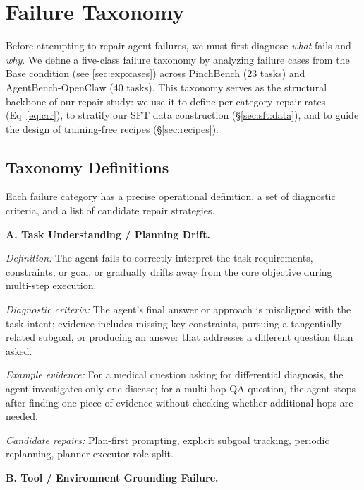 \section{Failure Taxonomy}
\label{sec:taxonomy}

Before attempting to repair agent failures, we must first diagnose \emph{what} fails and \emph{why}. We define a five-class failure taxonomy by analyzing failure cases from the Base condition (see \ref{sec:exp:cases}) across PinchBench (23 tasks) and AgentBench-OpenClaw (40 tasks). This taxonomy serves as the structural backbone of our repair study: we use it to define per-category repair rates (Eq~\ref{eq:crr}), to stratify our SFT data construction (\S\ref{sec:sft:data}), and to guide the design of training-free recipes (\S\ref{sec:recipes}).


\subsection{Taxonomy Definitions}
\label{sec:taxonomy:definitions}

Each failure category has a precise operational definition, a set of diagnostic criteria, and a list of candidate repair strategies.

\bigskip
\noindent\textbf{A. Task Understanding / Planning Drift.}

\textit{Definition:} The agent fails to correctly interpret the task requirements, constraints, or goal, or gradually drifts away from the core objective during multi-step execution.

\textit{Diagnostic criteria:} The agent's final answer or approach is misaligned with the task intent; evidence includes missing key constraints, pursuing a tangentially related subgoal, or producing an answer that addresses a different question than asked.

\textit{Example evidence:} For a medical question asking for differential diagnosis, the agent investigates only one disease; for a multi-hop QA question, the agent stops after finding one piece of evidence without checking whether additional hops are needed.

\textit{Candidate repairs:} Plan-first prompting, explicit subgoal tracking, periodic replanning, planner-executor role split.

\bigskip
\noindent\textbf{B. Tool / Environment Grounding Failure.}

